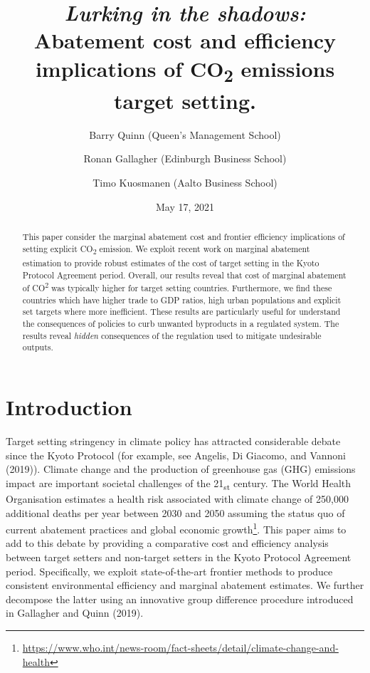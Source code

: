 \documentclass[
  10pt,
]{article}
\title{\emph{Lurking in the shadows:} Abatement cost and efficiency
implications of CO\textsubscript{2} emissions target setting.}
\author{Barry Quinn (Queen's Management School) \and Ronan Gallagher (Edinburgh Business School) \and Timo Kuosmanen (Aalto Business School)}
\date{May 17, 2021}
\begin{document}
\maketitle
\begin{abstract}
This paper consider the marginal abatement cost and frontier efficiency
implications of setting explicit CO\textsubscript{2} emission. We
exploit recent work on marginal abatement estimation to provide robust
estimates of the cost of target setting in the Kyoto Protocol Agreement
period. Overall, our results reveal that cost of marginal abatement of
CO\textsuperscript{2} was typically higher for target setting countries.
Furthermore, we find these countries which have higher trade to GDP
ratios, high urban populations and explicit set targets where more
inefficient. These results are particularly useful for understand the
consequences of policies to curb unwanted byproducts in a regulated
system. The results reveal \emph{hidden} consequences of the regulation
used to mitigate undesirable outputs.
\end{abstract}

\hypertarget{introduction}{%
\section{Introduction}\label{introduction}}

Target setting stringency in climate policy has attracted considerable
debate since the Kyoto Protocol (for example, see Angelis, Di Giacomo,
and Vannoni (2019)). Climate change and the production of greenhouse gas
(GHG) emissions impact are important societal challenges of the
21\textsubscript{st} century. The World Health Organisation estimates a
health risk associated with climate change of 250,000 additional deaths
per year between 2030 and 2050 assuming the status quo of current
abatement practices and global economic growth\footnote{\url{https://www.who.int/news-room/fact-sheets/detail/climate-change-and-health}}.
This paper aims to add to this debate by providing a comparative cost
and efficiency analysis between target setters and non-target setters in
the Kyoto Protocol Agreement period. Specifically, we exploit
state-of-the-art frontier methods to produce consistent environmental
efficiency and marginal abatement estimates. We further decompose the
latter using an innovative group difference procedure introduced in
Gallagher and Quinn (2019).
\end{document}
